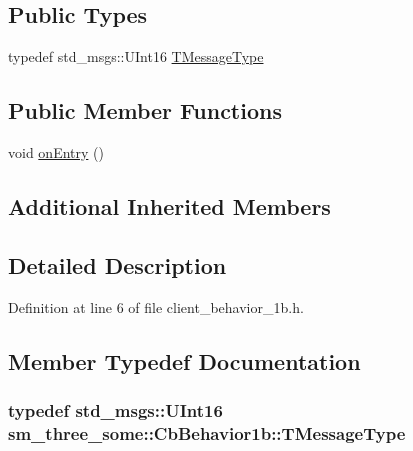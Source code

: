 \subsection*{Public Types}
\begin{DoxyCompactItemize}
\item 
typedef std\+\_\+msgs\+::\+U\+Int16 \hyperlink{classsm__three__some_1_1CbBehavior1b_a1b6b180e89709372778f7dda2e87f3b4}{T\+Message\+Type}
\end{DoxyCompactItemize}
\subsection*{Public Member Functions}
\begin{DoxyCompactItemize}
\item 
void \hyperlink{classsm__three__some_1_1CbBehavior1b_a82e1a5a580ccaf3130c2cb3cd638309d}{on\+Entry} ()
\end{DoxyCompactItemize}
\subsection*{Additional Inherited Members}


\subsection{Detailed Description}


Definition at line 6 of file client\+\_\+behavior\+\_\+1b.\+h.



\subsection{Member Typedef Documentation}
\subsubsection[{\texorpdfstring{T\+Message\+Type}{TMessageType}}]{\setlength{\rightskip}{0pt plus 5cm}typedef std\+\_\+msgs\+::\+U\+Int16 {\bf sm\+\_\+three\+\_\+some\+::\+Cb\+Behavior1b\+::\+T\+Message\+Type}}\hypertarget{classsm__three__some_1_1CbBehavior1b_a1b6b180e89709372778f7dda2e87f3b4}{}\label{classsm__three__some_1_1CbBehavior1b_a1b6b180e89709372778f7dda2e87f3b4}


